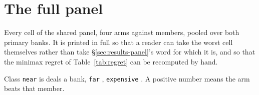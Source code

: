 \section{The full panel}
\label{app:panel}

Every cell of the shared panel, four arms against \vsevenPanelMembers{} members, pooled over both
primary banks. It is printed in full so that a reader can take the worst cell themselves rather than
take \S\ref{sec:results-panel}'s word for which it is, and so that the minimax regret of
Table~\ref{tab:regret} can be recomputed by hand.

Class \texttt{near} is \vsevenDealsNear{} deals a bank, \texttt{far} \vsevenDealsFar{},
\texttt{expensive} \vsevenDealsExpensive{}. A
positive number means the arm beats that member.

{\tabfont}
